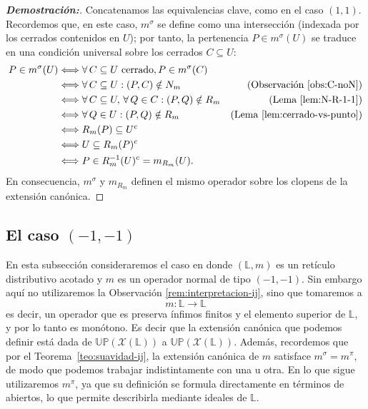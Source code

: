 \documentclass[12pt]{book}
\newcommand{\Up}{\mathbb{UP}}
\begin{document}
\begin{proof}[\textbf{Demostración:}]
Concatenamos las equivalencias clave, como en el caso $(1,1)$. Recordemos que, en este caso, $m^\sigma$ se define como una
intersección (indexada por los cerrados contenidos en $U$);
por tanto, la pertenencia $P\in m^\sigma(U)$ se traduce en una
condición universal sobre los cerrados $C\subseteq U$:
\begin{align*}
P \in m^\sigma(U)
&\Longleftrightarrow 
\forall\,C\subseteq U \text{ cerrado}, P\in m^\sigma(C)\\
&\Longleftrightarrow 
\forall\,C\subseteq U: (P,C)\notin N_m & \text{(Observación~\ref{obs:C-noN})}\\
&\Longleftrightarrow 
\forall\,C\subseteq U,\,\forall\,Q\in C: (P,Q)\notin R_m
& \text{(Lema~\ref{lem:N-R-1-1})}\\
&\Longleftrightarrow \forall\,Q\in U: (P,Q)\notin R_m & \text{(Lema~\ref{lem:cerrado-vs-punto})}\\
&\Longleftrightarrow 
R_m(P)\subseteq U^c\\
&\Longleftrightarrow 
U\subseteq R_m(P)^c\\
&\Longleftrightarrow 
P\in R_m^{-1}(U)^c=m_{R_m}(U).
\end{align*}
En consecuencia, $m^\sigma$ y $m_{R_m}$ definen el mismo operador sobre los clopens de la extensión canónica.
\end{proof}
\noindent

\subsection*{El caso $(-1,-1)$}

En esta subsección consideraremos el caso en donde $(\mathbb{L},m)$ es un retículo distributivo acotado y $m$ es un operador normal de tipo $(-1,-1)$. Sin embargo aquí no utilizaremos la Observación \ref{rem:interpretacion-ij}, sino que tomaremos a
\[
  m \colon \mathbb{L} \longrightarrow \mathbb{L}
\]
es decir, un operador que es preserva ínfimos finitos y el elemento superior de $\mathbb{L}$, y por lo tanto es monótono. Es decir que la extensión canónica que podemos definir está dada de $\Up(\mathcal{X}(\mathbb{L}))$ a $\Up(\mathcal{X}(\mathbb{L}))$. Además, recordemos que por el Teorema~\ref{teo:suavidad-ij}, la extensión canónica de $m$ satisface
$m^\sigma = m^\pi$, de modo que podemos trabajar indistintamente con
una u otra. En lo que sigue utilizaremos $m^\pi$, ya que su definición
se formula directamente en términos de abiertos, lo que permite
describirla mediante ideales de $\mathbb{L}$.
\end{document}
